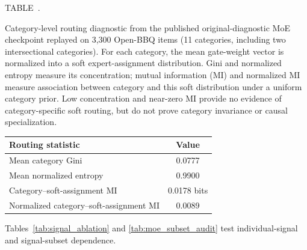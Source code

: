 \documentclass{ieeeaccess}
\newcommand{\inlinetablecaption}[2]{%
  \par\vspace{0.62\baselineskip}\noindent
  \refstepcounter{table}\label{#1}%
  {\color{accessblue}\tablecapheadfont TABLE~\thetable.\ }%
  {\tablecapfont #2\par}%
  \vspace{6pt}%
}
\begin{document}
\noindent\begin{minipage}{\columnwidth}
\inlinetablecaption{tab:routing_stats}{Category-level routing diagnostic from the published original-diagnostic MoE checkpoint replayed on 3,300 Open-BBQ items (11 categories, including two intersectional categories). For each category, the mean gate-weight vector is normalized into a soft expert-assignment distribution. Gini and normalized entropy measure its concentration; mutual information (MI) and normalized MI measure association between category and this soft distribution under a uniform category prior. Low concentration and near-zero MI provide no evidence of category-specific soft routing, but do not prove category invariance or causal specialization.}
\begin{center}
\scriptsize
\setlength{\tabcolsep}{4pt}
\begin{tabular}{lc}
\toprule
Routing statistic & Value \\
\midrule
Mean category Gini & 0.0777 \\
Mean normalized entropy & 0.9900 \\
Category--soft-assignment MI & 0.0178 bits \\
Normalized category--soft-assignment MI & 0.0089 \\
\bottomrule
\end{tabular}
\end{center}
\end{minipage}
\par\vspace{0.5\baselineskip}

Tables~\ref{tab:signal_ablation} and \ref{tab:moe_subset_audit} test individual-signal and signal-subset dependence.
\end{document}

